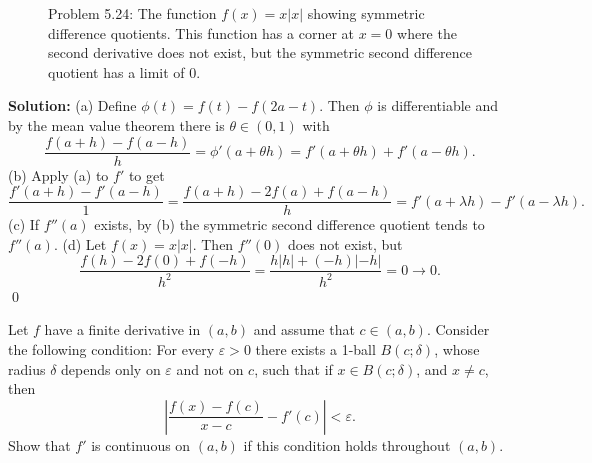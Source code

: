 \begin{figure}[h]
\centering
{}
\caption{Problem 5.24: The function $f(x) = x|x|$ showing symmetric difference quotients. This function has a corner at $x=0$ where the second derivative does not exist, but the symmetric second difference quotient has a limit of 0.}
\end{figure}

\bigskip\noindent\textbf{Solution:}
(a) Define $\phi(t)=f(t)-f(2a-t)$. Then $\phi$ is differentiable and by the mean value theorem there is $\theta\in(0,1)$ with
\[\frac{f(a+h)-f(a-h)}{h}=\phi'(a+\theta h)=f'(a+\theta h)+f'(a-\theta h).\]
(b) Apply (a) to $f'$ to get
\[\frac{f'(a+h)-f'(a-h)}{1}=\frac{f(a+h)-2f(a)+f(a-h)}{h}=f'(a+\lambda h)-f'(a-\lambda h).\]
(c) If $f''(a)$ exists, by (b) the symmetric second difference quotient tends to $f''(a)$. (d) Let $f(x)=x|x|$. Then $f''(0)$ does not exist, but
\[\frac{f(h)-2f(0)+f(-h)}{h^2}=\frac{h|h|+(-h)|-h|}{h^2}=0\to 0.\]\qed


\begin{problembox}
\begin{problemstatement}
Let \( f \) have a finite derivative in \( (a, b) \) and assume that \( c \in (a, b) \). Consider the following condition: For every \( \varepsilon > 0 \) there exists a 1-ball \( B(c; \delta) \), whose radius \( \delta \) depends only on \( \varepsilon \) and not on \( c \), such that if \( x \in B(c; \delta) \), and \( x \neq c \), then
\[ \left| \frac{f(x) - f(c)}{x - c} - f'(c) \right| < \varepsilon. \]
Show that \( f' \) is continuous on \( (a, b) \) if this condition holds throughout \( (a, b) \).
\end{problemstatement}
\end{problembox}

